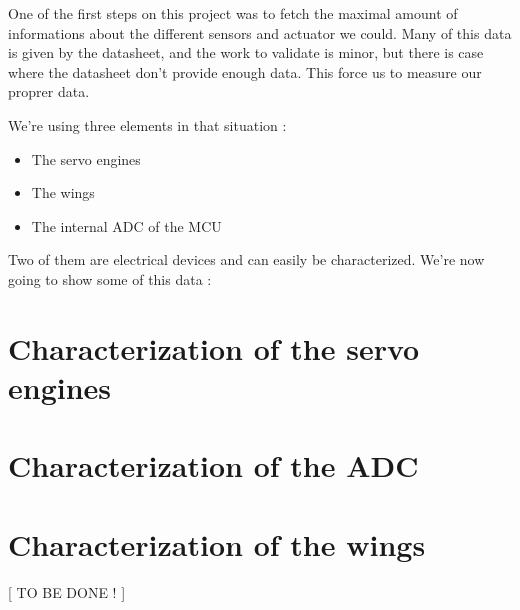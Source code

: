 One of the first steps on this project was to fetch the maximal amount of informations
about the different sensors and actuator we could.
Many of this data is given by the datasheet, and the work to validate is minor, but there 
is case where the datasheet don't provide enough data.
This force us to measure our proprer data.

We're using three elements in that situation : 
\begin{itemize}
    \item The servo engines
    \item The wings
    \item The internal ADC of the MCU
\end{itemize}

Two of them are electrical devices and can easily be characterized.
We're now going to show some of this data :

\section{Characterization of the servo engines}


\section{Characterization of the ADC}


\section{Characterization of the wings}

[ TO BE DONE ! ]


